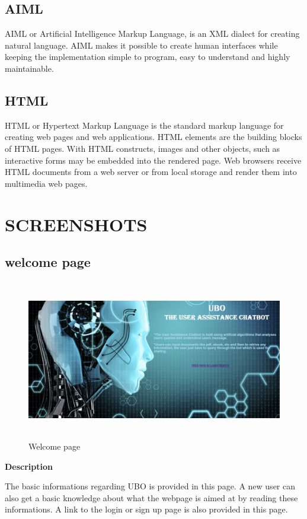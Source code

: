 \documentclass[12pt,a4paper,oneside]{report}
\begin{document}
\subsection{AIML}
AIML or Artificial Intelligence Markup Language, is an XML dialect for creating natural language. AIML makes it possible to create human interfaces while keeping the implementation simple to program, easy to understand and highly maintainable.
\subsection{HTML}
HTML or Hypertext Markup Language is the standard markup language for creating web pages and web applications. HTML elements are the building blocks of HTML pages. With HTML constructs, images and other objects, such as interactive forms may be embedded into the rendered page. Web browsers receive HTML documents from a web server or from local storage and render them into multimedia web pages.
\newpage
\section{SCREENSHOTS}
\subsection{welcome page}
\begin{figure}[h]
	\begin{center}
		\includegraphics[width=13cm,height=7cm]{home_screen.png}
			\caption{Welcome page}
			\label{Welcome page}
	\end{center}
\end{figure}
\textbf{Description}
\par The basic informations regarding UBO is provided in this page. A new user can also get a basic knowledge about what the webpage is aimed at by reading these informations. A link to the login or sign up page is also provided in this page.
\end{document}
